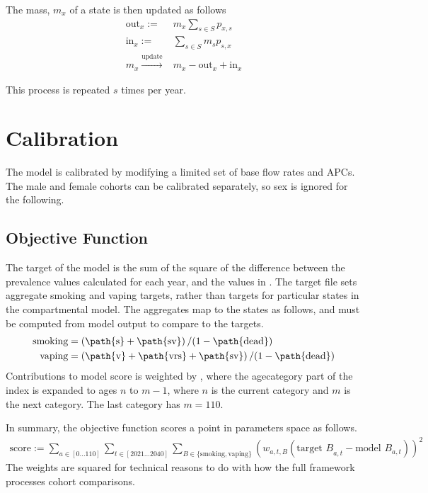 \documentclass[]{article}
\begin{document}
	The mass, $m_{x}$ of a state is then updated as follows
	\begin{align*}
		\text{out}_x :=& m_x\sum_{s \in S} p_{x,s} \\
		\text{in}_x :=& \sum_{s \in S}m_s p_{s,x} \\
		m_x \xrightarrow{\text{update}}& m_x - \text{out}_x + \text{in}_x
	\end{align*}
	
	This process is repeated $s$ times per year.
	
	\section{Calibration}
	
	The model is calibrated by modifying a limited set of base flow rates and APCs. The male and female cohorts can be calibrated separately, so sex is ignored for the following.
	
	\subsection{Objective Function}
	The target of the model is the sum of the square of the difference between the prevalence values calculated for each year, and the values in . The target file sets aggregate smoking and vaping targets, rather than targets for particular states in the compartmental model. The aggregates map to the states as follows, and must be computed from model output to compare to the targets.
	\begin{align*}
		\text{smoking} &= \left(\text{\path{s}} + \text{\path{sv}}\right) / (1 - \text{\path{dead}}) \\
		\text{vaping} &= \left(\text{\path{v}} + \text{\path{vrs}} + \text{\path{sv}}\right) / (1 - \text{\path{dead}})
	\end{align*}
	Contributions to model score is weighted by , where the agecategory part of the index is expanded to ages $n$ to $m-1$, where $n$ is the current category and $m$ is the next category. The last category has $m = 110$.
	
	In summary, the objective function scores a point in parameters space as follows.
	\begin{align*}
		\text{score} := \sum_{a \in [0\ldots110]} \sum_{t \in [2021\ldots2040]} \sum_{B \in \{\text{smoking}, \text{vaping}\}}\left(w_{a, t, B} \left(\text{target $B$}_{a, t} - \text{model $B$}_{a, t}\right)\right)^2
	\end{align*}
	The weights are squared for technical reasons to do with how the full framework processes cohort comparisons.
	
\end{document}
